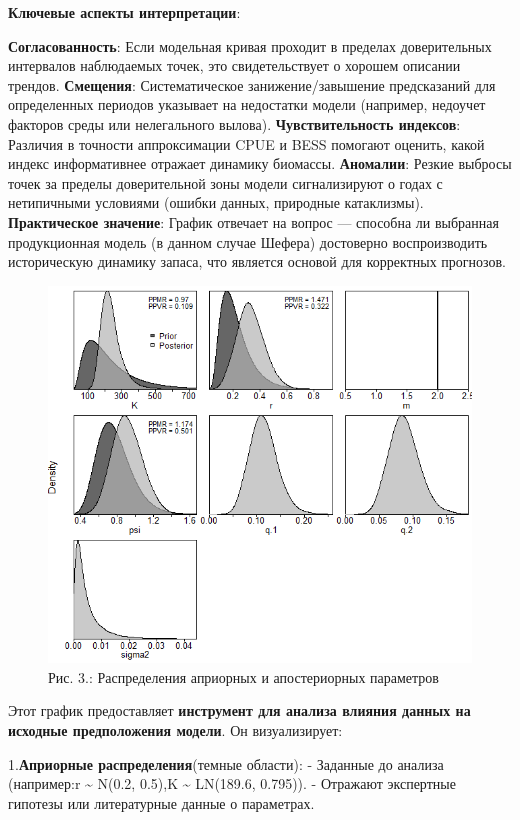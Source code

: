 \documentclass[
  letterpaper,
  DIV=11,
  numbers=noendperiod]{scrreprt}
\begin{document}
\textbf{Ключевые аспекты интерпретации}:

\textbf{Согласованность}: Если модельная кривая проходит в пределах
доверительных интервалов наблюдаемых точек, это свидетельствует о
хорошем описании трендов. \textbf{Смещения}: Систематическое
занижение/завышение предсказаний для определенных периодов указывает на
недостатки модели (например, недоучет факторов среды или нелегального
вылова). \textbf{Чувствительность индексов}: Различия в точности
аппроксимации CPUE и BESS помогают оценить, какой индекс информативнее
отражает динамику биомассы. \textbf{Аномалии}: Резкие выбросы точек за
пределы доверительной зоны модели сигнализируют о годах с нетипичными
условиями (ошибки данных, природные катаклизмы). \textbf{Практическое
значение}: График отвечает на вопрос --- способна ли выбранная
продукционная модель (в данном случае Шефера) достоверно воспроизводить
историческую динамику запаса, что является основой для корректных
прогнозов.

\begin{figure}[H]

{\centering \includegraphics[width=0.6\linewidth,height=\textheight,keepaspectratio]{images/JABBA3.png}

}

\caption{Рис. 3.: Распределения априорных и апостериорных параметров}

\end{figure}%

Этот график предоставляет \textbf{инструмент для анализа влияния данных
на исходные предположения модели}. Он визуализирует:

1.\textbf{Априорные распределения}(темные области): - Заданные до
анализа (например:r \textasciitilde{} N(0.2, 0.5),K \textasciitilde{}
LN(189.6, 0.795)). - Отражают экспертные гипотезы или литературные
данные о параметрах.
\end{document}
